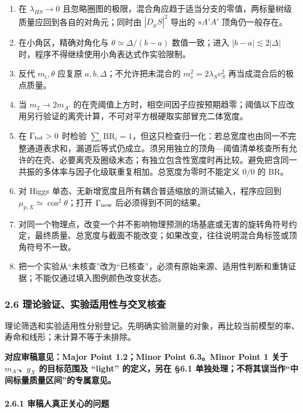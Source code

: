 \documentclass[
  chinese,
  UTF8]{ctexart}
\providecommand{\tightlist}{%
  \setlength{\itemsep}{0pt}\setlength{\parskip}{0pt}}
\begin{document}
\begin{enumerate}
\def\labelenumi{\arabic{enumi}.}
\tightlist
\item
  在 \(\lambda_{HS}\to0\)
  且忽略圈图的极限，混合角应趋于适当分支的零值，两标量树级质量应回到各自的对角元；同时由
  \(|D_\mu S|^2\) 导出的 \(sA'A'\) 顶角仍一般存在。
\item
  在小角区，精确对角化与 \(\theta\simeq\Delta/(b-a)\) 数值一致；进入
  \(|b-a|\lesssim2|\Delta|\) 时，程序不得继续使用小角表达式作实验限制。
\item
  反代 \(m_i,\theta\) 应复原 \(a,b,\Delta\)；不允许把未混合的
  \(m_s^2=2\lambda_S v_S^2\) 再当成混合后的极点质量。
\item
  当 \(m_2\to2m_{A'}\)
  的在壳阈值上方时，相空间因子应按预期趋零；阈值以下应改用另行验证的离壳计算，不可对平方根硬取实部冒充二体宽度。
\item
  在 \(\Gamma_{\rm tot}>0\) 时检验
  \(\sum_i\mathrm{BR}_i=1\)，但这只检查归一化：若总宽度也由同一不完整通道表求和，漏道后等式仍成立。须另用独立的顶角---阈值清单核查所有允许的在壳、必要离壳及圈级末态；有独立包含性宽度时再比较。避免把含同一共振的多体率与因子化级联重复相加。总宽度为零时不能定义
  \(0/0\) 的 BR。
\item
  对 Higgs 单态、无新增宽度且所有耦合普适缩放的测试输入，程序应回到
  \(\mu_{p,X}\simeq\cos^2\theta\)；打开 \(\Gamma_{\rm new}\)
  后必须得到不同的结果。
\item
  对同一个物理点，改变一个并不影响物理预测的场基底或无害的旋转角符号约定，最终质量、总宽度与截面不能改变；如果改变，往往说明混合角标签或顶角符号不一致。
\item
  把一个实验从``未核查''改为``已核查''，必须有原始来源、适用性判断和重铸证据；不能仅通过填入图例颜色改变状态。
\end{enumerate}

\subsubsection{2.6 理论验证、实验适用性与交叉核查}\label{major-1-step-6}

理论筛选和实验适用性分别登记。先明确实验测量的对象，再比较当前模型的率、寿命和线形；未计算不等于未排除。

\textbf{对应审稿意见：Major Point 1.2；Minor Point 6.3。Minor Point 1
关于 \(m_{A'}\)、\(g_X\) 的目标范围及 ``light'' 的定义，另在 §6.1
单独处理；不将其误当作``中间标量质量区间''的专属意见。}

\paragraph{2.6.1
审稿人真正关心的问题}\label{ux5ba1ux7a3fux4ebaux771fux6b63ux5173ux5fc3ux7684ux95eeux9898}
\end{document}
